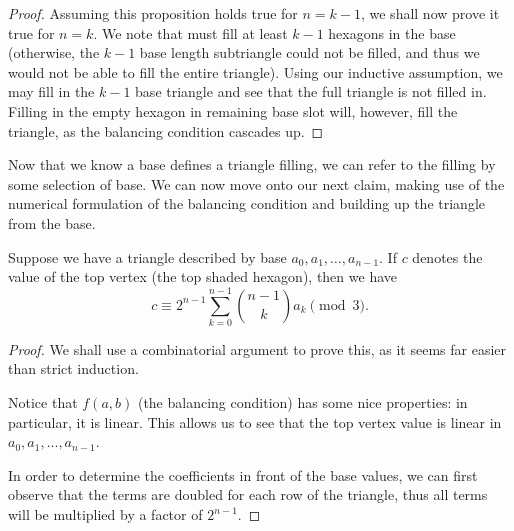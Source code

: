 \begin{solution}{3}
\begin{proof}
        Assuming this proposition holds true for \( n = k - 1 \), we shall now
        prove it true for \( n = k \). We note that must fill at least \( k - 1
        \) hexagons in the base (otherwise, the \( k - 1 \) base length
        subtriangle could not be filled, and thus we would not be able to fill
        the entire triangle). Using our inductive assumption, we may fill in
        the \( k - 1 \) base triangle and see that the full triangle is not
        filled in. Filling in the empty hexagon in remaining base slot will,
        however, fill the triangle, as the balancing condition cascades up.
    \end{proof}
    Now that we know a base defines a triangle filling, we can refer to the
    filling by some selection of base. We can now move onto our next claim,
    making use of the numerical formulation of the balancing condition and
    building up the triangle from the base.
    \begin{claim}
        Suppose we have a triangle described by base \( a_0, a_1, \ldots,
        a_{n-1} \). If \( c \) denotes the value of the top vertex (the top
        shaded hexagon), then we have
        \[
            c \equiv 2^{n-1} \sum_{k = 0}^{n - 1} \binom{n - 1}{k} a_k \pmod{3}
        .\]
    \end{claim}
    \begin{proof}
        We shall use a combinatorial argument to prove this, as it seems far
        easier than strict induction.

        Notice that \( f(a, b) \) (the balancing condition) has some nice
        properties: in particular, it is linear. This allows us to see that the
        top vertex value is linear in \( a_0, a_1, \ldots, a_{n-1} \).

        In order to determine the coefficients in front of the base values, we can first observe that the terms are doubled for each row of the triangle, thus all terms will be multiplied by a factor of \( 2^{n-1} \).


\end{proof}
\end{solution}
